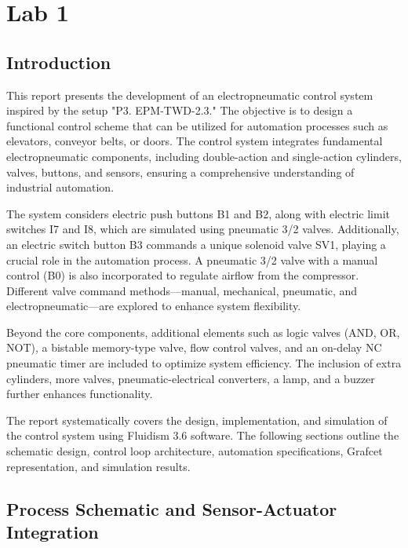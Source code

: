 \section{Lab 1} 

\subsection{Introduction} \label{sec:Introduction}

This report presents the development of an electropneumatic control system inspired by the 
setup "P3. EPM-TWD-2.3." The objective is to design a functional control scheme that can be
utilized for automation processes such as elevators, conveyor belts, or doors. The control system 
integrates fundamental electropneumatic components, including double-action and single-action cylinders, 
valves, buttons, and sensors, ensuring a comprehensive understanding of industrial automation.

The system considers electric push buttons B1 and B2, along with electric limit switches I7 
and I8, which are simulated using pneumatic 3/2 valves. Additionally, an electric switch button 
B3 commands a unique solenoid valve SV1, playing a crucial role in the automation process. A 
pneumatic 3/2 valve with a manual control (B0) is also incorporated to regulate airflow from the 
compressor. Different valve command methods—manual, mechanical, pneumatic, and electropneumatic—are 
explored to enhance system flexibility.

Beyond the core components, additional elements such as logic valves (AND, OR, NOT), a bistable
 memory-type valve, flow control valves, and an on-delay NC pneumatic timer are included to optimize 
 system efficiency. The inclusion of extra cylinders, more valves, pneumatic-electrical converters, a 
 lamp, and a buzzer further enhances functionality.

The report systematically covers the design, implementation, and simulation of the control system 
using Fluidism 3.6 software. The following sections outline the schematic design, control loop 
architecture, automation specifications, Grafcet representation, and simulation results.

\subsection{Process Schematic and Sensor-Actuator Integration} \label{sec:Process_Schematic_and_Sensor-Actuator_Integration}

